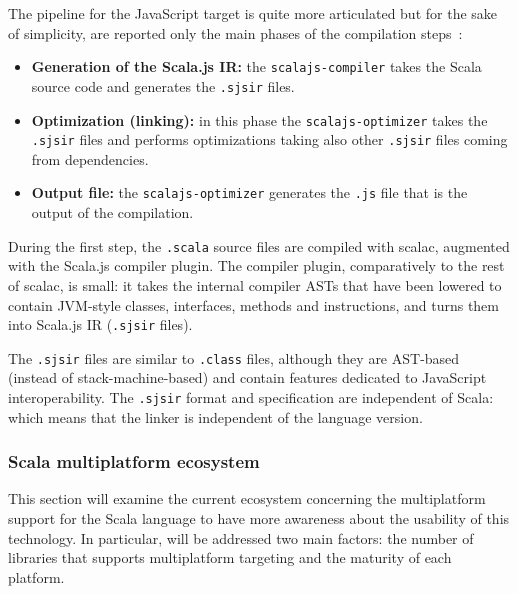 
The pipeline for the JavaScript target is quite more articulated but for the sake of simplicity, are reported only the main phases of the compilation
steps~\cite{Doeraene:256862}:
\begin{itemize}
	\item \textbf{Generation of the Scala.js IR:} the \texttt{scalajs-compiler} takes the Scala source code and generates the \texttt{.sjsir} files.
	\item \textbf{Optimization (linking):} in this phase the \texttt{scalajs-optimizer} takes the \texttt{.sjsir} files and performs optimizations
	      taking also other \texttt{.sjsir} files coming from dependencies.
	\item \textbf{Output file:} the \texttt{scalajs-optimizer} generates the \texttt{.js} file that is the output of the compilation.
\end{itemize}

During the first step, the \texttt{.scala} source files are compiled with scalac, augmented with the Scala.js compiler plugin.
The compiler plugin, comparatively to the rest of scalac, is small: it takes the internal compiler ASTs that have been lowered to contain JVM-style
classes, interfaces, methods and instructions, and turns them into Scala.js IR (\texttt{.sjsir} files).

The \texttt{.sjsir} files are similar to \texttt{.class} files, although they are AST-based (instead of stack-machine-based) and contain features
dedicated to JavaScript interoperability. The \texttt{.sjsir} format and specification are independent of Scala: which means that the linker is
independent of the language version.

\subsubsection{Scala multiplatform ecosystem}

This section will examine the current ecosystem concerning the multiplatform support for the Scala language to have more awareness about the
usability of this technology.
In particular, will be addressed two main factors: the number of libraries that supports multiplatform targeting and the maturity of each platform.


